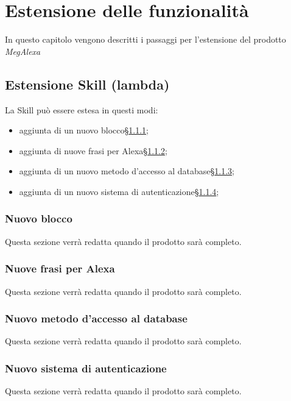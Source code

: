 \chapter{Estensione delle funzionalità}\label{estensione}
In questo capitolo vengono descritti i passaggi per l'estensione del prodotto \textit{MegAlexa}
\section{Estensione Skill (lambda)}
La Skill può essere estesa in questi modi:
\begin{itemize}
    \item aggiunta di un nuovo blocco\S\ref{newBlock};
    \item aggiunta di nuove frasi per Alexa\S\ref{newFrasi};
    \item aggiunta di un nuovo metodo d'accesso al database\S\ref{newAccesso};
    \item aggiunta di un nuovo sistema di autenticazione\S\ref{newAuth};
\end{itemize}
\subsection{Nuovo blocco}\label{newBlock}
Questa sezione verrà redatta quando il prodotto sarà completo.
\subsection{Nuove frasi per Alexa}\label{newFrasi}
Questa sezione verrà redatta quando il prodotto sarà completo.
\subsection{Nuovo metodo d'accesso al database}\label{newAccesso}
Questa sezione verrà redatta quando il prodotto sarà completo.
\subsection{Nuovo sistema di autenticazione}\label{newAuth}
Questa sezione verrà redatta quando il prodotto sarà completo.